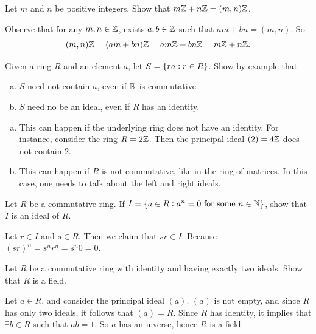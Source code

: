 \begin{problem}
	Let $ m $ and $ n $ be positive integers. Show that $ m\mathbb{Z} + n\mathbb{Z} = (m,n) \mathbb{Z} $.
\end{problem}
\begin{solution}
	Observe that for any $ m,n\in \mathbb{Z} $, exists $ a,b\in \mathbb{Z} $ such that $ am + bn = (m,n) $. So
	\[ (m,n)\mathbb{Z} = (am + bn)\mathbb{Z} = am\mathbb{Z} + bn\mathbb{Z} = m\mathbb{Z} + n\mathbb{Z}. \]
\end{solution}

\begin{problem}
	Given a ring $ R $ and an element $ a $, let $ S = \{ra:r\in R\} $. Show by example that
	\begin{enumerate}[(a)]
		\item $ S $ need not contain $ a $, even if $ \mathbb{R} $ is commutative.
		\item $ S $ need no be an ideal, even if $ R $ has an identity.
	\end{enumerate}
\end{problem}
\begin{solution}
	\begin{enumerate}[(a)]
		\item This can happen if the underlying ring does not have an identity. For instance, consider the ring $ R = 2\mathbb{Z} $. Then the principal ideal $ (2) = 4\mathbb{Z} $ does not contain $ 2 $.
		
		\item This can happen if $ R $ is not commutative, like in the ring of matrices. In this case, one needs to talk about the left and right ideals.
	\end{enumerate}
\end{solution}

\begin{problem}
	Let $ R $ be a commutative ring. If $ I = \{a\in R: a^n = 0\text{ for some $ n\in \mathbb{N} $}\} $, show that $ I $ is an ideal of $ R $.
\end{problem}
\begin{solution}
	Let $ r\in I $ and $ s\in R $. Then we claim that $ sr \in I $. Because $ (sr)^n = s^n r^n = s^n 0 = 0 $. 
\end{solution}


\begin{problem}
	Let $ R $ be a commutative ring with identity and having exactly two ideals. Show that $ R $ is a field.
\end{problem}
\begin{solution}
	Let $ a\in R $, and consider the principal ideal  $ (a) $. $ (a) $ is not empty, and since $ R $ has only two ideals, it follows that $ (a) = R $. Since $ R $ has identity, it implies that $ \exists b\in R $ such that $ ab = 1 $. So $ a $ has an inverse, hence $ R $ is a field.
\end{solution}


